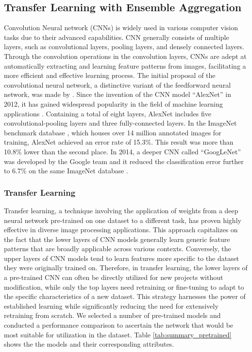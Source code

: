 \documentclass[11pt]{article}
\begin{document}
\subsection{Transfer Learning with Ensemble Aggregation}

Convolution Neural network (CNNs) is widely used in various computer vision tasks due to their advanced capabilities. CNN generally consists of multiple layers, such as convolutional layers, pooling layers, and densely connected layers. Through the convolution operations in the convolution layers, CNNs are adept at automatically extracting and learning feature patterns from images, facilitating a more efficient and effective learning process. The initial proposal of the convolutional neural network, a distinctive variant of the feedforward neural network, was made by \citet{lecun1990handwritten}. Since the invention of the CNN model “AlexNet” in 2012, it has gained widespread popularity in the field of machine learning applications \citep{krizhevsky2012imagenet}. Containing a total of eight layers, AlexNet includes five convolutional-pooling layers and three fully-connected layers. In the ImageNet benchmark database \citep{deng2009imagenet}, which houses over 14 million annotated images for training, AlexNet achieved an error rate of 15.3\%. This result was more than 10.8\% lower than the second place. In 2014, a deeper CNN called “GoogLeNet” was developed by the Google team and it reduced the classification error further to 6.7\% on the same ImageNet database \citep{szegedy2015going}.

\subsubsection{Transfer Learning}
Transfer learning, a technique involving the application of weights from a deep neural network pre-trained on one dataset to a different task, has proven highly effective in diverse image processing applications. This approach capitalizes on the fact that the lower layers of CNN models generally learn generic feature patterns that are broadly applicable across various contexts. Conversely, the upper layers of CNN models tend to learn features more specific to the dataset they were originally trained on. Therefore, in transfer learning, the lower layers of a pre-trained CNN can often be directly utilized for new projects without modification, while only the top layers need retraining or fine-tuning to adapt to the specific characteristics of a new dataset. This strategy harnesses the power of established learning while significantly reducing the need for extensively retraining from scratch. We selected a number of pre-trained models and conducted a performance comparison to ascertain the network that would be most suitable for utilization in the dataset. Table \ref{tab:summary_pretrained} shows the the models and their corresponding attributes. 
\end{document}
